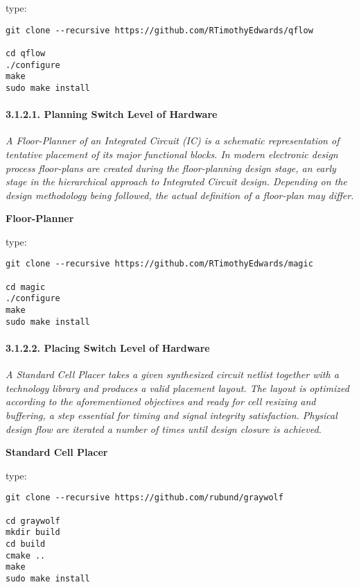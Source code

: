 \documentclass[]{article}
\let\oldparagraph\paragraph
\renewcommand{\paragraph}[1]{\oldparagraph{#1}\mbox{}}
\begin{document}
type:

\begin{verbatim}
git clone --recursive https://github.com/RTimothyEdwards/qflow

cd qflow
./configure
make
sudo make install
\end{verbatim}

\paragraph{3.1.2.1. Planning Switch Level of
Hardware}\label{planning-switch-level-of-hardware}

\emph{A Floor-Planner of an Integrated Circuit (IC) is a schematic
representation of tentative placement of its major functional blocks. In
modern electronic design process floor-plans are created during the
floor-planning design stage, an early stage in the hierarchical approach
to Integrated Circuit design. Depending on the design methodology being
followed, the actual definition of a floor-plan may differ.}

\textbf{Floor-Planner}

type:

\begin{verbatim}
git clone --recursive https://github.com/RTimothyEdwards/magic

cd magic
./configure
make
sudo make install
\end{verbatim}

\paragraph{3.1.2.2. Placing Switch Level of
Hardware}\label{placing-switch-level-of-hardware}

\emph{A Standard Cell Placer takes a given synthesized circuit netlist
together with a technology library and produces a valid placement
layout. The layout is optimized according to the aforementioned
objectives and ready for cell resizing and buffering, a step essential
for timing and signal integrity satisfaction. Physical design flow are
iterated a number of times until design closure is achieved.}

\textbf{Standard Cell Placer}

type:

\begin{verbatim}
git clone --recursive https://github.com/rubund/graywolf

cd graywolf
mkdir build
cd build
cmake ..
make
sudo make install
\end{verbatim}
\end{document}
